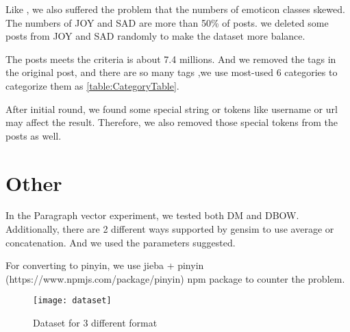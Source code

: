 Like \cite{zhao2012moodlens}, we also suffered the problem that the numbers of emoticon classes skewed. The numbers of JOY and SAD are more than 50\% of posts. 
we deleted some posts from JOY and SAD randomly to make the dataset more balance.  

The posts meets the criteria is about 7.4 millions. And we removed the tags in the original post, and there are so many tags 
,we use most-used 6 categories to categorize them as \ref{table:CategoryTable}.

After initial round, we found some special string or tokens like username or url may affect the result. 
Therefore, we also removed those special tokens from the posts as well.

\section{Other}

In the Paragraph vector experiment, we tested both DM and DBOW. Additionally, there are 2 different ways supported by gensim to use average or concatenation.
And we used the parameters suggested. 

For converting to pinyin, we use jieba + pinyin (https://www.npmjs.com/package/pinyin) npm package to counter the problem.


\begin{figure}[h]
    \centering
	\texttt{[image: dataset]}
    \caption{Dataset for 3 different format}
    \label{fig:sub1}
\end{figure}

